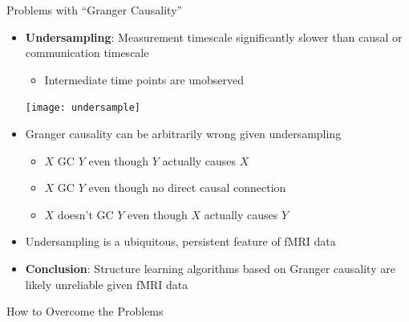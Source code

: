 \documentclass[final,hyperref={pdfpagelabels=false}]{beamer}
\begin{document}
\begin{frame}{}
\begin{columns}[t]
\begin{column}{.48\linewidth}
\begin{block}{\Large Problems with ``Granger Causality''}
\begin{itemize}
          \item \textbf{Undersampling}: Measurement timescale significantly slower than
          causal or communication timescale 
          \begin{itemize} \item Intermediate time points are unobserved \end{itemize} %
          
          \texttt{[image: undersample]}

          \item Granger causality can be arbitrarily wrong given undersampling
          \begin{itemize}
            \item $X$ GC $Y$ even though $Y$ actually causes $X$
            \item $X$ GC $Y$ even though no direct causal connection
            \item $X$ doesn't GC $Y$ even though $X$ actually causes $Y$
            \end{itemize}
          
          \item Undersampling is a ubiquitous, persistent feature of fMRI data
          
          \item \textbf{Conclusion}: Structure learning algorithms based on Granger causality
          are likely unreliable given fMRI data
          \end{itemize}
        \end{block}

        \begin{block}{\Large How to Overcome the Problems}
          \begin{minipage}{0.5\textwidth}
            \vspace{10 mm}
            \LinesNumberedHidden
\end{minipage}
\end{block}
\end{column}
\end{columns}
\end{frame}
\end{document}

